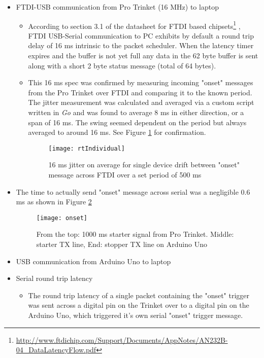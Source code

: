 \begin{itemize}
    \item FTDI-USB communication from Pro Trinket (16 MHz) to laptop
    \begin{itemize}
        \item According to section 3.1 of the datasheet for FTDI based chipsets\footnote{\url{http://www.ftdichip.com/Support/Documents/AppNotes/AN232B-04_DataLatencyFlow.pdf}} , FTDI USB-Serial communication to PC exhibits by default a round trip delay of 16 ms intrinsic to the packet scheduler. When the latency timer expires and the buffer is not yet full any data in the 62 byte buffer is sent along with a short 2 byte status message (total of 64 bytes).
        \item This 16 ms spec was confirmed by measuring incoming "onset" messages from the Pro Trinket over FTDI and comparing it to the known period. The jitter measurement was calculated and averaged via a custom script written in \textit{Go} and was found to average 8 ms in either direction, or a span of 16 ms. The swing seemed dependent on the period but always averaged to around 16 ms. See Figure \ref{fig:rtIndividual} for confirmation.
        \begin{figure}[H] \label{fig:rtIndividual}
            \centering  
            \texttt{[image: rtIndividual]}
            \caption{16 ms jitter on average for single device drift between "onset" message across FTDI over a set period of 500 ms}
        \end{figure}
    \end{itemize}
    \item The time to actually send "onset" message across serial was a negligible 0.6 ms as shown in Figure \ref{fig:onsetMessage}
    \begin{figure}[H] \label{fig:onsetMessage}
        \centering
        \texttt{[image: onset]}
        \caption{From the top: 1000 ms starter signal from Pro Trinket. Middle: starter TX line, End: stopper TX line on Arduino Uno}
    \end{figure}
    \item USB communication from Arduino Uno to laptop
    \item Serial round trip latency
        \begin{itemize}
            \item The round trip latency of a single packet containing the "onset" trigger was sent across a digital pin on the Trinket over to a digital pin on the Arduino Uno, which triggered it's own serial "onset" trigger message.

\end{itemize}
\end{itemize}
